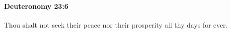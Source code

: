 
		\paragraph{Deuteronomy 23:6} %
			\label{DEUTERONOMY-23-6}

			Thou shalt not seek their peace nor their prosperity all thy days for ever.



